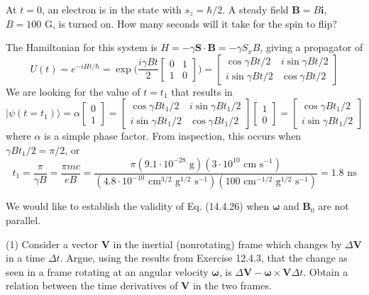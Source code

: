 \documentclass[../principles-of-quantum-mechanics.tex]{subfiles}
\begin{document}
\begin{questions}
		\question At $t = 0$, an electron is in the state with $s_z = \hbar/2$. A steady field $\mathbf{B} = B\mathbf{i}$, $B = 100\text{ G}$, is turned on. How many seconds will it take for the spin to flip?
		
		\begin{solution}
			The Hamiltonian for this system is $H = -\gamma \mathbf{S}\cdot\mathbf{B} = -\gamma S_xB$, giving a propagator of
			$$U(t) = e^{-iHt/\hbar} = \exp\Big({\frac{i\gamma Bt}{2}}\begin{bmatrix}0 & 1 \\ 1 & 0\end{bmatrix}\Big) = \begin{bmatrix}\cos\gamma Bt/2 & i\sin\gamma Bt/2 \\ i\sin \gamma Bt/2 & \cos\gamma Bt/2\end{bmatrix}$$
			We are looking for the value of $t = t_1$ that results in
			$$|\psi(t = t_1)\rangle = \alpha\begin{bmatrix}0 \\ 1 \end{bmatrix} = \begin{bmatrix}\cos\gamma Bt_1/2 & i\sin\gamma Bt_1/2 \\ i\sin \gamma Bt_1/2 & \cos\gamma Bt_1/2\end{bmatrix}\begin{bmatrix}1 \\ 0\end{bmatrix} = \begin{bmatrix}\cos\gamma Bt_1/2 \\ i\sin \gamma Bt_1/2\end{bmatrix}$$
			where $\alpha$ is a simple phase factor. From inspection, this occurs when $\gamma Bt_1/2 = \pi/2$, or
			$$ t_1 = \frac{\pi}{\gamma B} = \frac{\pi mc}{eB} = \frac{\pi(9.1\cdot10^{-28}\text{ g})(3\cdot10^{10}\text{ cm}\text{ s}^{-1})}{(4.8\cdot 10^{-10}\text{ cm}^{3/2}\text{ g}^{1/2}\text{ s}^{-1})(100\text{ cm}^{-1/2}\text{ g}^{1/2}\text{ s}^{-1})} = 1.8\text{ ns}$$
		\end{solution}
		
		\question We would like to establish the validity of Eq. (14.4.26) when $\boldsymbol{\omega}$ and $\mathbf{B}_0$ are not parallel.
		
		(1) Consider a vector $\mathbf{V}$ in the inertial (nonrotating) frame which changes by $\Delta\mathbf{V}$ in a time $\Delta t$. Argue, using the results from Exercise 12.4.3, that the change as seen in a frame rotating at an angular velocity $\boldsymbol{\omega}$, is $\Delta \mathbf{V} - \boldsymbol{\omega}\times\mathbf{V}\Delta t$. Obtain a relation between the time derivatives of $\mathbf{V}$ in the two frames.
		

\end{questions}
\end{document}
